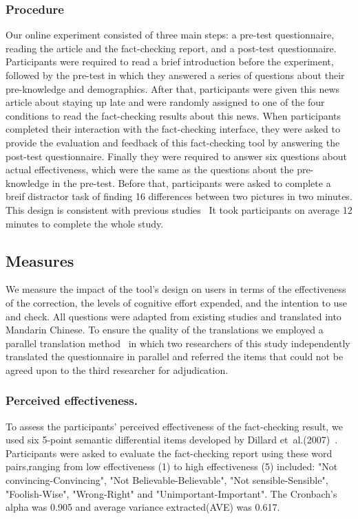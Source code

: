 \subsubsection{Procedure}
Our online experiment consisted of three main steps: a pre-test questionnaire, reading the article and the fact-checking report, and a post-test questionnaire.
Participants were required to read a brief introduction before the experiment, followed by the pre-test in which they answered a series of questions about their pre-knowledge and demographics.
After that, participants were given this news article about staying up late and were randomly assigned to one of the four conditions to read the fact-checking results about this news.
When participants completed their interaction with the fact-checking interface, they were asked to provide the evaluation and feedback of this fact-checking tool by answering the post-test questionnaire.
Finally they were required to answer six questions about actual effectiveness, which were the same as the questions about the pre-knowledge in the pre-test.
Before that, participants were asked to complete a breif distractor task of finding 16 differences between two pictures in two minutes. This design is consistent with previous studies~\cite{swire2017role,ecker2015he,walter2021unchecked,amazeen2018correcting}
It took participants on average 12 minutes to complete the whole study.

\subsection{Measures}
We measure the impact of the tool's design on users in terms of the effectiveness of the correction, the levels of cognitive effort expended, and the intention to use and check.
All questions were adapted from existing studies and translated into Mandarin Chinese. 
To ensure the quality of the translations we employed a parallel translation method~\cite{harkness2004survey} in which two researchers of this study independently translated the questionnaire in parallel and referred the items that could not be agreed upon to the third researcher for adjudication.

\subsubsection{Perceived effectiveness.}
To assess the participants' perceived effectiveness of the fact-checking result, we used six 5-point semantic differential items developed by Dillard et al.(2007)~\cite{dillard2007does}.
Participants were asked to evaluate the fact-checking report using these word pairs,ranging from low effectiveness (1) to high effectiveness (5) included: "Not convincing-Convincing", "Not Believable-Believable", "Not sensible-Sensible", "Foolish-Wise", "Wrong-Right" and "Unimportant-Important".
The Cronbach’s alpha was 0.905 and average variance extracted(AVE) was 0.617.


